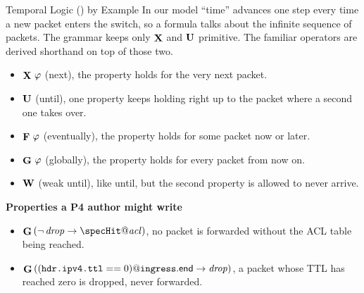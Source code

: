 \begin{frame}{Temporal Logic (\LTL{}) by Example}
  In our model ``time'' advances one step every time a new packet enters the
  switch, so a formula talks about the infinite sequence of packets. The grammar
  keeps only \(\mathop{\mathbf{X}}\) and \(\mathbin{\mathbf{U}}\) primitive. The familiar operators are
  derived shorthand on top of those two.

  \vspace{0.5em}
  \begin{itemize}\setlength\itemsep{6pt}
    \item \(\mathop{\mathbf{X}}\,\varphi\) (next), the property holds for the very next packet.
    \item \(\mathbin{\mathbf{U}}\) (until), one property keeps holding right up to the packet
          where a second one takes over.
    \item \(\mathop{\mathbf{F}}\,\varphi\) (eventually), the property holds for some
          packet now or later.
    \item \(\mathop{\mathbf{G}}\,\varphi\) (globally), the property holds for every packet
          from now on.
    \item \(\mathbin{\mathbf{W}}\) (weak until), like until, but the second property is
          allowed to never arrive.
  \end{itemize}

  \vspace{0.4em}
  \raggedright\footnotesize
  \textbf{Properties a P4 author might write}
  \begin{itemize}\setlength\itemsep{5pt}
    \item \(\Globally\,(\lnot\,\specDrop \rightarrow \specHit@\mathit{acl})\),
          no packet is forwarded without the ACL table being reached.
    \item \(\mathop{\mathbf{G}}\,((\texttt{hdr.ipv4.ttl} == 0)@\texttt{ingress}.\mathsf{end}
          \rightarrow \mathit{drop})\), a packet whose TTL has reached zero is
          dropped, never forwarded.
  \end{itemize}
\end{frame}

